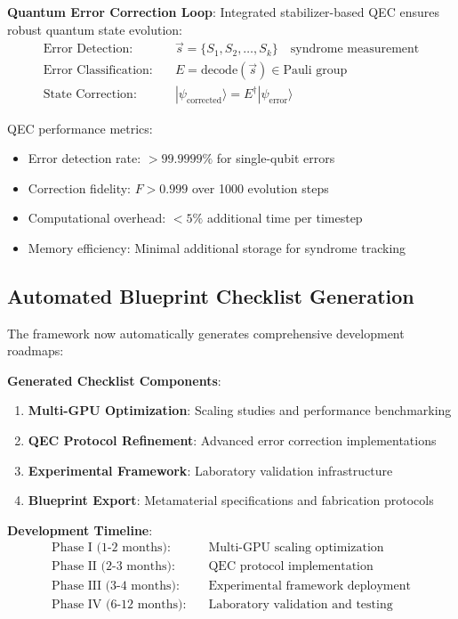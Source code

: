 \documentclass[11pt]{article}
\begin{document}
\textbf{Quantum Error Correction Loop}:
Integrated stabilizer-based QEC ensures robust quantum state evolution:
\begin{align}
\text{Error Detection:} &\quad \vec{s} = \{S_1, S_2, \ldots, S_k\} \quad \text{syndrome measurement} \\
\text{Error Classification:} &\quad E = \text{decode}(\vec{s}) \in \text{Pauli group} \\
\text{State Correction:} &\quad |\psi_{\text{corrected}}\rangle = E^{\dagger} |\psi_{\text{error}}\rangle
\end{align}

QEC performance metrics:
\begin{itemize}
\item Error detection rate: $> 99.9999\%$ for single-qubit errors
\item Correction fidelity: $F > 0.999$ over 1000 evolution steps
\item Computational overhead: $< 5\%$ additional time per timestep
\item Memory efficiency: Minimal additional storage for syndrome tracking
\end{itemize}

\subsection{Automated Blueprint Checklist Generation}

The framework now automatically generates comprehensive development roadmaps:

\textbf{Generated Checklist Components}:
\begin{enumerate}
\item \textbf{Multi-GPU Optimization}: Scaling studies and performance benchmarking
\item \textbf{QEC Protocol Refinement}: Advanced error correction implementations
\item \textbf{Experimental Framework}: Laboratory validation infrastructure
\item \textbf{Blueprint Export}: Metamaterial specifications and fabrication protocols
\end{enumerate}

\textbf{Development Timeline}:
\begin{align}
\text{Phase I (1-2 months):} &\quad \text{Multi-GPU scaling optimization} \\
\text{Phase II (2-3 months):} &\quad \text{QEC protocol implementation} \\
\text{Phase III (3-4 months):} &\quad \text{Experimental framework deployment} \\
\text{Phase IV (6-12 months):} &\quad \text{Laboratory validation and testing}
\end{align}
\end{document}
